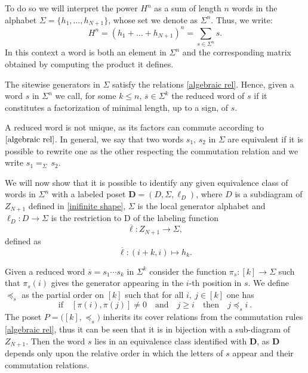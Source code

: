\documentclass{article}
\begin{document}
To do so we will interpret the power $H^n$ as a sum of length $n$ words in the alphabet $\Sigma=\{h_1,\dots,h_{N+1}\}$, whose set we denote as $\Sigma^n$. Thus, we write:
\begin{equation*}
H^n=\left(h_1+\dots+h_{N+1}\right)^n=\sum_{s\in\Sigma^n}s.
\end{equation*}
In this context a word is both an element in $\Sigma^n$ and the corresponding matrix obtained by computing the product it defines. 

The sitewise generators in \(\Sigma\) satisfy the relations \eqref{algebraic rel}. Hence, given a word $s$ in $\Sigma^n$ we call, for some $k\leq n$, $\overline{s}\in\Sigma^k$ the reduced word of $s$ if it constitutes a factorization of minimal length, up to a sign, of $s$. 

A reduced word is not unique, as its factors can commute according to $\eqref{algebraic rel}$. In general, we say that two words $s_1,\,s_2$ in $\Sigma$ are equivalent if it is possible to rewrite one as the other respecting the commutation relation and we write $s_1=_{\Sigma}\, s_2$.

We will now show that it is possible to identify any given equivalence class of words in $\Sigma^n$ with a labeled poset $\boldsymbol{D}=(D,\Sigma,\ell_D)$, where $D$ is a subdiagram of $Z_{N+1}$  defined in \eqref{inifinite shape}, $\Sigma$ is the local generator alphabet and $\ell_D\colon D\to\Sigma$ is the restriction to D of the  labeling function
\begin{equation*}
    \overline{\ell}\colon Z_{N+1}\to\Sigma,
\end{equation*}
defined as
\begin{equation}
    \label{labeling}
    \overline{\ell}\colon (i+k,i)\mapsto h_k.
\end{equation}

Given a reduced word $\overline{s}=s_1\cdots s_k$ in $\Sigma^k$ consider the function $\pi_s\colon [k]\to\Sigma$ such that $\pi_s(i)$ gives the generator appearing in the $i$-th position in $s$. We define $\preceq_s$ as the partial order on $[k]$ such that for all $i,\ j\in[k]$ one has  
\begin{equation*}
    \text{if}\quad[\pi(i),\pi(j)]\neq0 \quad \text{and}\quad j\geq i \quad\text{then}\quad j\preceq_s i \ .
\end{equation*}
The poset $P=\big([k],\preceq_s\big)$ inherits its cover relations from the commutation rules \eqref{algebraic rel}, thus it can be seen that it is in bijection with a sub-diagram of $Z_{N+1}$. Then the word $s$ lies in an equivalence class identified with $\boldsymbol{D}$, as $\boldsymbol{D}$ depends only upon the relative order in which the letters of $s$ appear and their commutation relations.
\end{document}
